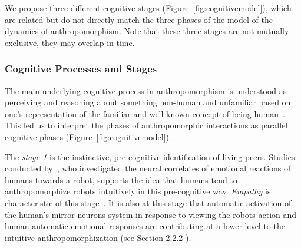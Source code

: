 \documentclass{frontiersSCNS} %
\begin{document}
We propose three different cognitive stages (Figure~\ref{fig:cognitivemodel}),
which are related but do not directly match the three phases of
the model of the dynamics of anthropomorphism. Note that these three stages are not mutually exclusive, they may overlap in time.


\subsubsection{Cognitive Processes and Stages\\}

The main underlying cognitive process in anthropomorphism is understood as
perceiving and reasoning about something non-human and unfamiliar based on one's
representation of the familiar and well-known concept of being
human~\citep{epley_when_2008}. This led us to interpret the phases of
anthropomorphic interactions as parallel cognitive phases
(Figure~\ref{fig:cognitivemodel}).

The \emph{stage 1} is the instinctive, pre-cognitive identification of living
peers. Studies conducted by~\citet{rosenthal-vonderputten_experimental_2013},
who investigated the neural correlates of emotional reactions of humans towards
a robot, supports the idea that humans tend to anthropomorphize robots
intuitively in this pre-cognitive way. {\it Empathy} is characteristic of this
stage~\citep{rosenthalvonderPutten2013neural}.  It is also at this stage that
automatic activation of the human's mirror neurons system  in response to
viewing the robots action and human automatic emotional responses are
contributing at a lower level to the intuitive anthropomorphization (see Section
2.2.2 ).
\end{document}
